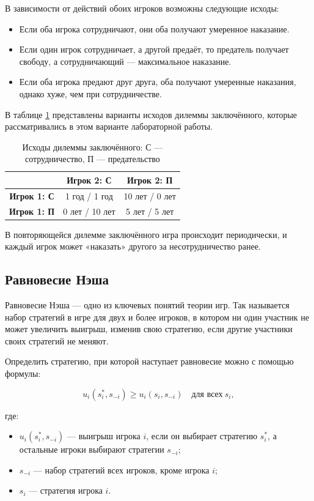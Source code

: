 \documentclass[a4paper, final]{article}
\begin{document}
	В зависимости от действий обоих игроков возможны следующие исходы:
	\begin{itemize}
		\item Если оба игрока сотрудничают, они оба получают умеренное наказание.
		\item Если один игрок сотрудничает, а другой предаёт, то предатель получает свободу, а сотрудничающий — максимальное наказание.
		\item Если оба игрока предают друг друга, оба получают умеренные наказания, однако хуже, чем при сотрудничестве.
	\end{itemize}
	
	В таблице \ref{tbl:exodus} представлены варианты исходов дилеммы заключённого, которые рассматривались в этом варианте лабораторной работы.
	
	\begin{table}[h!]
		\centering
		\caption{Исходы дилеммы заключённого: \( \text{С} \) — сотрудничество, \( \text{П} \) — предательство}
		\label{tbl:exodus}
		\footnotesize
		\begin{tabular}{|c|c|c|}
			\hline
			& \textbf{Игрок 2: С} & \textbf{Игрок 2: П} \\
			\hline
			\textbf{Игрок 1: С} & 1 год / 1 год & 10 лет / 0 лет \\
			\hline
			\textbf{Игрок 1: П} & 0 лет / 10 лет & 5 лет / 5 лет \\
			\hline
		\end{tabular}
	\end{table}
	
	
	В повторяющейся дилемме заключённого игра происходит периодически, и каждый игрок может «наказать» другого за несотрудничество ранее.
	
	\subsection{Равновесие Нэша}
	Равновесие Нэша — одно из ключевых понятий теории игр. Так называется набор стратегий в игре для двух и более игроков, в котором ни один участник не может увеличить выигрыш, изменив свою стратегию, если другие участники своих стратегий не меняют.
	
	Определить стратегию, при которой наступает равновесие можно с помощью формулы:
	
	\[
	u_i(s_i^*, s_{-i}) \geq u_i(s_i, s_{-i}) \quad \text{для всех} \ s_i,
	\]
	
	где:
	\begin{itemize}
		\item $u_i(s_i^*, s_{-i})$ — выигрыш игрока $i$, если он выбирает стратегию $s_i^*$, а остальные игроки выбирают стратегии $s_{-i}$;
		\item $s_{-i}$ — набор стратегий всех игроков, кроме игрока $i$;
		\item $s_i$ — стратегия игрока $i$.
	\end{itemize}
	
\end{document}
